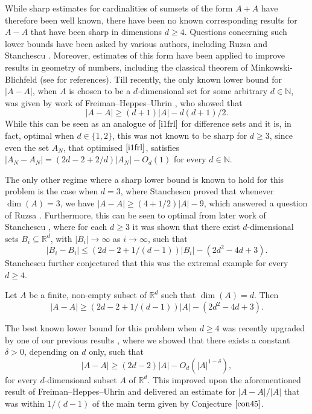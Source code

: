 While sharp estimates for cardinalities of sumsets of the form $A+A$ have therefore been well known, there have been no known corresponding results for $A-A$ that have been sharp in dimensions $d \geq 4$. Questions concerning such lower bounds have been asked by various authors, including Ruzsa \cite{Ru1994} and Stanchescu \cite{St2001}. Moreover, estimates of this form have been applied to improve results in geometry of numbers, including the classical theorem of Minkowski-Blichfeld (see \cite{Ak2021} for references). Till recently, the only known lower bound for $|A-A|$, when $A$ is chosen to be a $d$-dimensional set for some arbitrary $d \in \mathbb{N}$, was given by work of Freiman--Heppes--Uhrin \cite{FHU1989}, who showed that
\begin{equation} \label{inm}
  |A-A| \geq (d+1)|A| - d(d+1)/2. 
  \end{equation}
While this can be seen as an analogue of $\eqref{i1frl}$ for difference sets and it is, in fact, optimal when $d \in \{1,2\}$, this was not known to be sharp for $d \geq 3$, since even the set $A_N$, that optimised $\eqref{i1frl}$, satisfies $|A_N - A_N| = (2d - 2 + 2/d)|A_N| - O_{d}(1)$ for every $d \in \mathbb{N}$.
\par

The only other regime where a sharp lower bound is known to hold for this problem is the case when $d=3$, where Stanchescu \cite{St1998} proved that whenever $\dim(A) = 3$, we have $|A-A| \geq (4 + 1/2)|A| - 9$, which answered a question of Ruzsa \cite{Ru1994}. Furthermore, this can be seen to optimal from later work of Stanchescu \cite{St2001}, where for each $d \geq 3$ it was shown that there exist $d$-dimensional sets $B_i \subseteq \mathbb{R}^d$, with $|B_i| \to \infty$ as $i \to \infty$, such that
\begin{equation} \label{con78}
 |B_i - B_i| \leq (2d - 2 + 1/(d-1))|B_i| - (2d^2 - 4d + 3). 
 \end{equation}
Stanchescu \cite{St2001} further conjectured that this was the extremal example for every $d \geq 4$.

\begin{Conjecture} \label{con45}
Let $A$ be a finite, non-empty subset of $\mathbb{R}^d$ such that $\dim(A) = d$. Then
\[ |A-A| \geq (2d - 2 + 1/(d-1))|A| - (2d^2 - 4d + 3). \]
\end{Conjecture}

The best known lower bound for this problem when $d \geq 4$ was recently upgraded by one of our previous results \cite{Ak2021}, where we showed that there exists a constant $\delta >0$, depending on $d$ only, such that
\[ |A-A| \geq (2d-2)|A| - O_{d}(|A|^{1-\delta}), \]
for every $d$-dimensional subset $A$ of $\mathbb{R}^d$. This improved upon the aforementioned result of Freiman--Heppes--Uhrin \cite{FHU1989} and delivered an estimate for $|A-A|/|A|$ that was within $1/(d-1)$ of the main term given by Conjecture $\ref{con45}$.
\par


